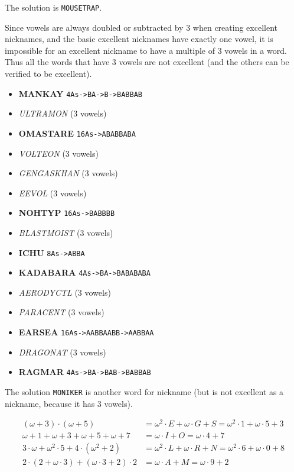 The solution is \texttt{MOUSETRAP}.


Since vowels are always doubled or subtracted by \(3\) when creating
excellent nicknames, and the basic excellent nicknames
have exactly one vowel, it is impossible for an excellent nickname
to have a multiple of \(3\) vowels in a word.
Thus all the words that have \(3\) vowels are not excellent (and the
others can be verified to be excellent).

\begin{multicols}{2}
  \begin{itemize}
    \item \textbf{MANKAY} \texttt{4As->BA->B->BABBAB}
    \item \textit{ULTRAMON} (3 vowels)
    \item \textbf{OMASTARE} \texttt{16As->ABABBABA}
    \item \textit{VOLTEON} (3 vowels)
    \item \textit{GENGASKHAN} (3 vowels)
    \item \textit{EEVOL} (3 vowels)
    \item \textbf{NOHTYP} \texttt{16As->BABBBB}
    \item \textit{BLASTMOIST} (3 vowels)
    \item \textbf{ICHU} \texttt{8As->ABBA}
    \item \textbf{KADABARA} \texttt{4As->BA->BABABABA}
    \item \textit{AERODYCTL} (3 vowels)
    \item \textit{PARACENT} (3 vowels)
    \item \textbf{EARSEA} \texttt{16As->AABBAABB->AABBAA}
    \item \textit{DRAGONAT} (3 vowels)
    \item \textbf{RAGMAR} \texttt{4As->BA->BAB->BABBAB}
  \end{itemize}
\end{multicols}

The solution \texttt{MONIKER} is another word for nickname
(but is not excellent as a nickname, because it has 3 vowels).


\begin{align*}
  (\omega+3)\cdot(\omega+5)&=\omega^2\cdot E+\omega\cdot G+S
                            =\omega^2\cdot 1+\omega\cdot 5+3 \\
  \omega+1+\omega+3+\omega+5+\omega+7&=\omega\cdot I+O
                                      =\omega\cdot 4+7 \\
  3\cdot\omega+\omega^2\cdot 5+4\cdot(\omega^2+2)&=
        \omega^2\cdot L+\omega\cdot R+N =
        \omega^2\cdot 6+\omega\cdot 0+8 \\
  2\cdot(2+\omega\cdot3)+(\omega\cdot3+2)\cdot2&=
        \omega\cdot A+M =
        \omega\cdot 9+2
\end{align*}

